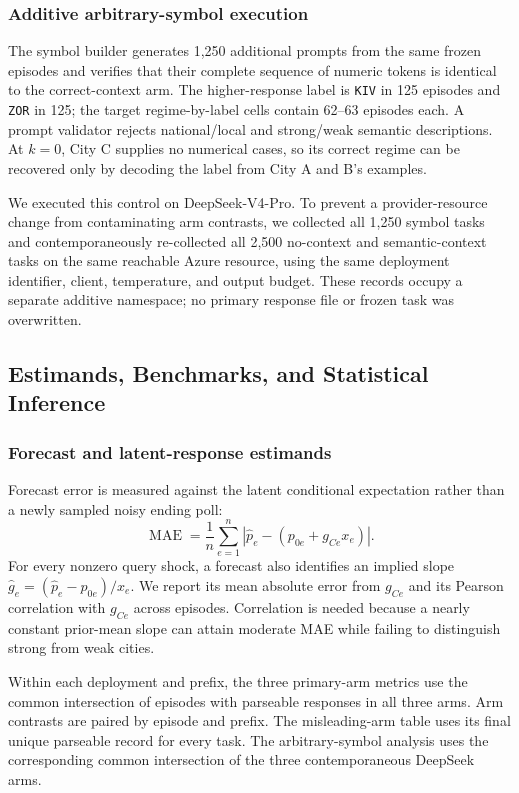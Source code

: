 \subsubsection{Additive arbitrary-symbol execution}
The symbol builder generates 1,250 additional prompts from the same frozen
episodes and verifies that their complete sequence of numeric tokens is identical
to the correct-context arm. The higher-response label is \texttt{KIV} in 125
episodes and \texttt{ZOR} in 125; the target regime-by-label cells contain 62--63
episodes each. A prompt validator rejects national/local and strong/weak semantic
descriptions. At \(k=0\), City C supplies no numerical cases, so its correct regime
can be recovered only by decoding the label from City A and B's examples.

We executed this control on DeepSeek-V4-Pro. To prevent a provider-resource change
from contaminating arm contrasts, we collected all 1,250 symbol tasks and
contemporaneously re-collected all 2,500 no-context and semantic-context tasks on
the same reachable Azure resource, using the same deployment identifier, client,
temperature, and output budget. These records occupy a separate additive namespace;
no primary response file or frozen task was overwritten.

\subsection{Estimands, Benchmarks, and Statistical Inference}
\label{app:coin-city-analysis}

\subsubsection{Forecast and latent-response estimands}
Forecast error is measured against the latent conditional expectation rather than
a newly sampled noisy ending poll:
\[
  \operatorname{MAE}
  =\frac{1}{n}\sum_{e=1}^{n}
    \left|\widehat p_e-(p_{0e}+g_{Ce}x_e)\right|.
\]
For every nonzero query shock, a forecast also identifies an implied slope
\(\widehat g_e=(\widehat p_e-p_{0e})/x_e\). We report its mean absolute error from
\(g_{Ce}\) and its Pearson correlation with \(g_{Ce}\) across episodes.
Correlation is needed because a nearly constant prior-mean slope can attain
moderate MAE while failing to distinguish strong from weak cities.

Within each deployment and prefix, the three primary-arm metrics use the common
intersection of episodes with parseable responses in all three arms. Arm
contrasts are paired by episode and prefix. The misleading-arm table uses its
final unique parseable record for every task. The arbitrary-symbol analysis uses
the corresponding common intersection of the three contemporaneous DeepSeek arms.

